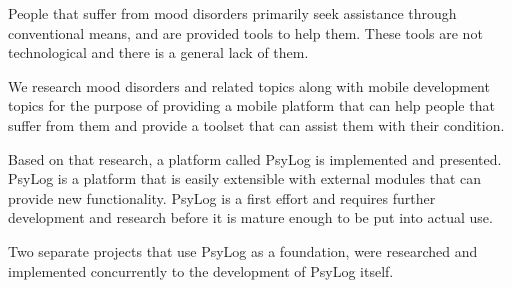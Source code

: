 People that suffer from mood disorders primarily seek assistance through conventional means, and are provided tools to help them.
These tools are not technological and there is a general lack of them.

We research mood disorders and related topics along with mobile development topics for the purpose of providing a mobile platform that can help people that suffer from them and provide a toolset that can assist them with their condition.

Based on that research, a platform called PsyLog is implemented and presented.
PsyLog is a platform that is easily extensible with external modules that can provide new functionality.
PsyLog is a first effort and requires further development and research before it is mature enough to be put into actual use.

Two separate projects that use PsyLog as a foundation, were researched and implemented concurrently to the development of PsyLog itself. 